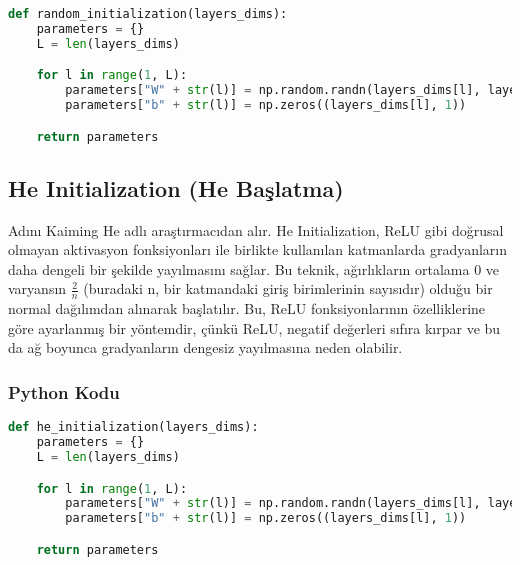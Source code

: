 \begin{lstlisting}[language=Python]
def random_initialization(layers_dims):
    parameters = {}
    L = len(layers_dims)

    for l in range(1, L):
        parameters["W" + str(l)] = np.random.randn(layers_dims[l], layers_dims[l - 1]) * 10
        parameters["b" + str(l)] = np.zeros((layers_dims[l], 1))

    return parameters
\end{lstlisting}

\newpage

\subsection{He Initialization (He Başlatma)}
Adını Kaiming He adlı araştırmacıdan alır. He Initialization, ReLU gibi doğrusal olmayan aktivasyon fonksiyonları ile birlikte kullanılan katmanlarda gradyanların daha dengeli bir şekilde yayılmasını sağlar. Bu teknik, ağırlıkların ortalama 0 ve varyansın $\frac{2}{n}$ (buradaki n, bir katmandaki giriş birimlerinin sayısıdır) olduğu bir normal dağılımdan alınarak başlatılır. Bu, ReLU fonksiyonlarının özelliklerine göre ayarlanmış bir yöntemdir, çünkü ReLU, negatif değerleri sıfıra kırpar ve bu da ağ boyunca gradyanların dengesiz yayılmasına neden olabilir.

\subsubsection{Python Kodu}

\begin{lstlisting}[language=Python]
def he_initialization(layers_dims):
    parameters = {}
    L = len(layers_dims)

    for l in range(1, L):
        parameters["W" + str(l)] = np.random.randn(layers_dims[l], layers_dims[l - 1]) * np.sqrt(2 / layers_dims[l - 1])
        parameters["b" + str(l)] = np.zeros((layers_dims[l], 1))

    return parameters
\end{lstlisting}

\newpage